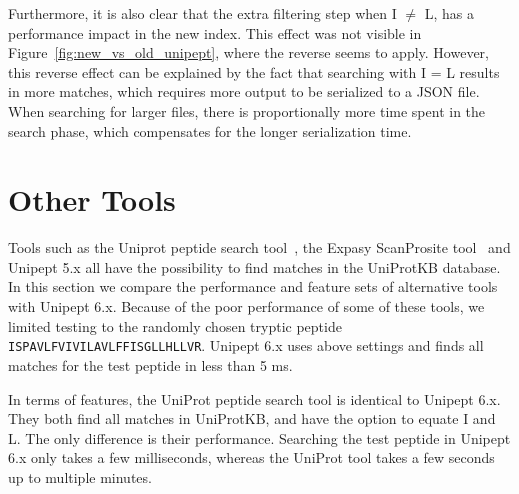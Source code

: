 \documentclass[11pt]{article}
\newenvironment{Figure}
{\par\medskip\noindent\minipage{\linewidth}}
{\endminipage\par\medskip}
\begin{document}
\begin{multicols}{2}
        Furthermore, it is also clear that the extra filtering step when I $\neq$ L, has a performance impact in the new index.
        This effect was not visible in Figure~\ref{fig:new_vs_old_unipept}, where the reverse seems to apply.
        However, this reverse effect can be explained by the fact that searching with I = L results in more matches, which requires more output to be serialized to a JSON file.
        When searching for larger files, there is proportionally more time spent in the search phase, which compensates for the longer serialization time.

        \begin{Figure}
            \centering
            \label{fig:new_vs_old_unipept_tryptic}
        \end{Figure}

        \section{Other Tools}\label{sec:comparison}
        Tools such as the Uniprot peptide search tool~\cite{uniprot_search_site, uniprot_search_paper}, the Expasy ScanProsite tool~\cite{scanprosite} and Unipept 5.x all have the possibility to find matches in the UniProtKB database.
        In this section we compare the performance and feature sets of alternative tools with Unipept 6.x.
        Because of the poor performance of some of these tools, we limited testing to the randomly chosen tryptic peptide \texttt{ISPAVLFVIVILAVLFFISGLLHLLVR}.
        Unipept 6.x uses above settings and finds all matches for the test peptide in less than 5 ms.

        In terms of features, the UniProt peptide search tool is identical to Unipept 6.x.
        They both find all matches in UniProtKB, and have the option to equate I and L\@.
        The only difference is their performance.
        Searching the test peptide in Unipept 6.x only takes a few milliseconds, whereas the UniProt tool takes a few seconds up to multiple minutes.


\end{multicols}
\end{document}
